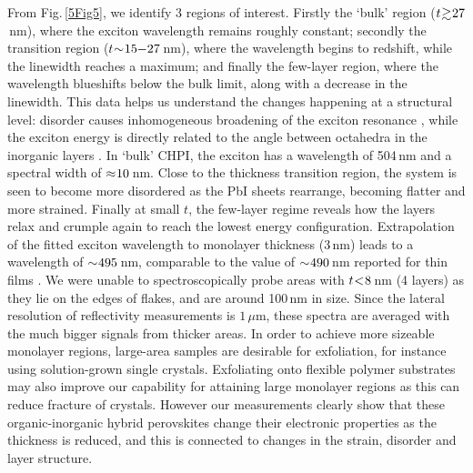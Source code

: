 From Fig.\,\ref{5Fig5}, we identify 3 regions of interest. Firstly the `bulk' region ($t\negmedspace\gtrsim\negmedspace27$\,nm), where the exciton wavelength remains roughly constant; secondly the transition region ($t\negmedspace\sim\negmedspace15\negmedspace-\negmedspace27$\,nm), where the wavelength begins to redshift, while the linewidth reaches a maximum; and finally the few-layer region, where the wavelength blueshifts below the bulk limit, along with a decrease in the linewidth. This data helps us understand the changes happening at a structural level: disorder causes inhomogeneous broadening of the exciton resonance \cite{Baranovskii1993, Andreani1998, Kuznetsova2010}, while the exciton energy is directly related to the angle between  octahedra in the inorganic layers \cite{Pradeesh2009}. In `bulk' CHPI, the exciton has a wavelength of 504\,nm and a spectral width of $\approx\negmedspace10$\,nm. Close to the thickness transition region, the system is seen to become more disordered as the PbI sheets rearrange, becoming flatter and more strained. Finally at small $t$, the few-layer regime reveals how the layers relax and crumple again to reach the lowest energy configuration. Extrapolation of the fitted exciton wavelength to monolayer thickness (3\,nm) leads to a wavelength of $\sim\negmedspace495$\,nm, comparable to the value of $\sim\negmedspace490$\,nm reported for  thin films \cite{Iwasaki1978, Goto1987}. We were unable to spectroscopically probe areas with $t\negmedspace<\negmedspace8$\,nm (4 layers) as they lie on the edges of flakes, and are around 100\,nm in size. Since the lateral resolution of reflectivity measurements is $1\,\mu$m, these spectra are averaged with the much bigger signals from thicker areas. In order to achieve more sizeable monolayer regions, large-area samples are desirable for exfoliation, for instance using solution-grown single crystals. Exfoliating onto flexible polymer substrates may also improve our capability for attaining large monolayer regions as this can reduce fracture of crystals. However our measurements clearly show that these organic-inorganic hybrid perovskites change their electronic properties as the thickness is reduced, and this is connected to changes in the strain, disorder and layer structure.

